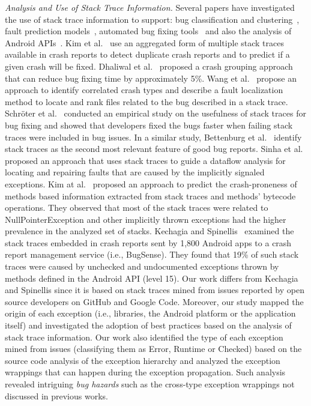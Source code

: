 {\textit{Analysis and Use of Stack Trace Information.} Several papers have
investigated the use of stack trace information to support: bug classification
and clustering~\cite{wang2013improving, kim2011crash, dhaliwal2011classifying},
fault prediction models~\cite{kim2013predicting}, automated
bug fixing tools~\cite{sinha2009fault} and also the analysis of Android APIs~\cite{kechagia2014}.
Kim et al.~\cite{kim2011crash} use an
aggregated form of multiple stack traces available in crash reports to detect
duplicate crash reports and to predict if a given crash will be fixed. Dhaliwal
et al.~\cite{dhaliwal2011classifying} proposed a crash grouping approach that
can reduce bug fixing time by approximately 5\%. Wang et
al.~\cite{wang2013improving} propose an approach to identify correlated crash
types and describe a fault localization method to locate and rank files related
to the bug described in a stack trace. Schr\"oter et al.~\cite{schroter2010stack}
conducted an empirical study on the usefulness of stack traces for bug fixing
and showed that developers fixed the bugs faster when failing stack traces were
included in bug issues.  In a similar study, Bettenburg et
al.~\cite{bettenburg2008makes} identify stack traces as the second most relevant
 feature of good bug reports.  Sinha et al.~\cite{sinha2009fault} proposed an
approach that uses stack traces to guide a dataflow analysis for locating and
repairing faults that are caused by the implicitly signaled exceptions. Kim
at al.~\cite{kim2013predicting} proposed an approach to predict the
crash-proneness of methods based information extracted from stack traces and
methods' bytecode operations.  They observed that most of the stack traces were
related to NullPointerException and other implicitly thrown exceptions had
the higher prevalence in the analyzed set of stacks. Kechagia and Spinellis~\cite{kechagia2014}
examined the stack traces embedded in crash reports sent by 1,800 Android apps
to a crash report management service (i.e., BugSense). They found that 19\% of such stack traces
were caused by unchecked and undocumented exceptions thrown by methods defined in the
Android API (level 15). Our work differs from Kechagia and Spinellis since it is based on
stack traces mined from issues reported by open source developers on GitHub and Google Code.
Moreover, our study mapped the origin of each exception
(i.e., libraries, the Android platform or the application itself) and investigated
the adoption of best practices based on the analysis of stack trace information.
Our work also identified the type of each exception mined from issues
(classifying them as Error, Runtime or Checked) based on the source code
analysis of the exception hierarchy and analyzed the exception wrappings that can
happen during the exception propagation.  Such analysis revealed intriguing
\emph{bug hazards} such as the cross-type exception wrappings not discussed in previous works.

}
